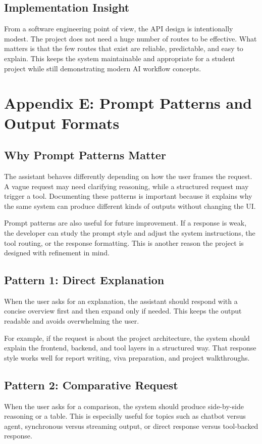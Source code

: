 \documentclass[11pt,oneside]{report}
\begin{document}
\section{Implementation Insight}
From a software engineering point of view, the API design is intentionally modest. The project does not need a huge number of routes to be effective. What matters is that the few routes that exist are reliable, predictable, and easy to explain. This keeps the system maintainable and appropriate for a student project while still demonstrating modern AI workflow concepts.

\chapter{Appendix E: Prompt Patterns and Output Formats}
\section{Why Prompt Patterns Matter}
The assistant behaves differently depending on how the user frames the request. A vague request may need clarifying reasoning, while a structured request may trigger a tool. Documenting these patterns is important because it explains why the same system can produce different kinds of outputs without changing the UI.

Prompt patterns are also useful for future improvement. If a response is weak, the developer can study the prompt style and adjust the system instructions, the tool routing, or the response formatting. This is another reason the project is designed with refinement in mind.

\section{Pattern 1: Direct Explanation}
When the user asks for an explanation, the assistant should respond with a concise overview first and then expand only if needed. This keeps the output readable and avoids overwhelming the user.

For example, if the request is about the project architecture, the system should explain the frontend, backend, and tool layers in a structured way. That response style works well for report writing, viva preparation, and project walkthroughs.

\section{Pattern 2: Comparative Request}
When the user asks for a comparison, the system should produce side-by-side reasoning or a table. This is especially useful for topics such as chatbot versus agent, synchronous versus streaming output, or direct response versus tool-backed response.
\end{document}
